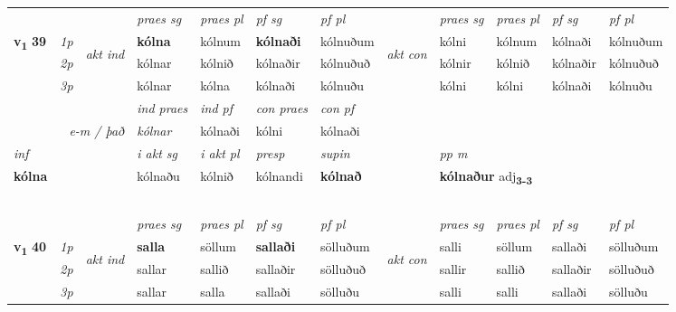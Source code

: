 \begin{longtable}[l]{X>{\footnotesize\itshape}llXXXXlXXXX}
 & &   & \textit{praes sg}  & \textit{praes pl}    & \textit{ pf sg} & \textit{pf pl} & & \textit{praes sg}  & \textit{praes pl}    & \textit{pf sg} & \textit{pf pl }  \\ \cmidrule{4-7} \cmidrule{9-12}
 \multirow{2}{*}{{{\textbf{v{\textsubscript{1}}} \Large{\textbf{39}}}}}  & 1p & \multirow{3}{*}{\begin{turn}{90}\textit{akt ind}\end{turn}} & \textbf{kólna} & kólnum & \textbf{kólnaði} & kólnuðum & \multirow{3}{*}{\begin{turn}{90}\textit{akt con}\end{turn}} &kólni & kólnum & kólnaði & kólnuðum\\*
 & 2p &  &  kólnar  & kólnið & kólnaðir & kólnuðuð & & kólnir & kólnið & kólnaðir & kólnuðuð \\*
 & 3p &  & kólnar & kólna & kólnaði & kólnuðu & & kólni & kólni& kólnaði & kólnuðu \\*
\cmidrule{4-7} \cmidrule{9-12}

   && &  \textit{ind praes} & \textit{ind pf} & \textit{con praes} & \textit{con pf} \\*
\multicolumn{3}{r}{\textit{e-m / það}} & kólnar & kólnaði & kólni & kólnaði \\*

\cmidrule{4-7}
   {\textit{inf}} & &  & \textit{i akt sg} & \textit{i akt pl}   & \textit{presp} & \textit{supin}  && \textit{pp m} \\*
  {\textbf{kólna}} & && kólnaðu  & kólnið   & kólnandi &  \textbf{kólnað}  && \multicolumn{2}{l}{\textbf{kólnaður} adj\textbf{\textsubscript{3-3}}} \\*

\midrule
& \\*
& \\*
& \\*
& \\*
& \\
\midrule

 & &   & \textit{praes sg}  & \textit{praes pl}    & \textit{ pf sg} & \textit{pf pl} & & \textit{praes sg}  & \textit{praes pl}    & \textit{pf sg} & \textit{pf pl }  \\ \cmidrule{4-7} \cmidrule{9-12}
 \multirow{2}{*}{{{\textbf{v{\textsubscript{1}}} \Large{\textbf{40}}}}}  & 1p & \multirow{3}{*}{\begin{turn}{90}\textit{akt ind}\end{turn}} & \textbf{salla} & söllum & \textbf{sallaði} & sölluðum & \multirow{3}{*}{\begin{turn}{90}\textit{akt con}\end{turn}} &salli & söllum & sallaði & sölluðum\\*
 & 2p &  &  sallar  & sallið & sallaðir & sölluðuð & & sallir & sallið & sallaðir & sölluðuð \\*
 & 3p &  & sallar & salla & sallaði & sölluðu & & salli & salli& sallaði & sölluðu \\*
\cmidrule{4-7} \cmidrule{9-12}


\end{longtable}
